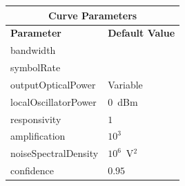 \begin{figure}
\begin{minipage}[b]{0.4\linewidth}
\begin{table}[H]
	\centering
	\footnotesize
	\begin{tabular}{|l|l|}
		\hline
		\multicolumn{2}{|c|}{ \textbf{Curve Parameters} } \\
		\hline
		\textbf{Parameter}     & \textbf{Default Value}                                     \\\hline
		bandwidth              & 															\\\hline
		symbolRate		       &                                                     		\\\hline
		outputOpticalPower     & Variable                                                   \\ \hline
		localOscillatorPower   & $0$~dBm                                                    \\ \hline
		responsivity           & $1$                                                        \\ \hline
		amplification          & $10^3$                                                     \\ \hline
		noiseSpectralDensity   & $10^6$~V$^2$                             \\ \hline
		confidence             & $0.95$                                                     \\ \hline

\end{tabular}
\end{table}
\end{minipage}
\end{figure}
